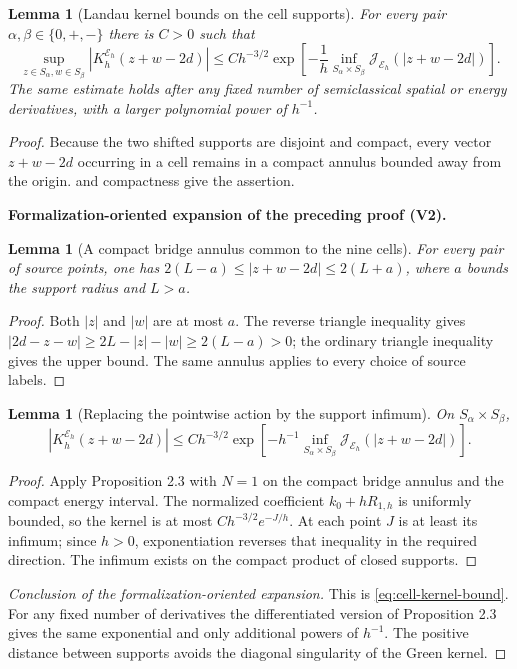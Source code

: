 \documentclass[11pt]{article}
\newtheorem{lemma}[theorem]{Lemma}
\newcommand{\formalisationparentid}{X}
\newenvironment{formalisationaddition}[1]{\par\medskip\begingroup\color{blue}\def\formalisationparentid{#1}\setcounter{formalizationsublemma}{0}\let\lemma\formalizationsublemma\let\endlemma\endformalizationsublemma
  \def\Eo{\mathcal E_h^\circ}\def\EE{\mathcal E_h}\def\phio{\phi_h^\circ}\def\phih{\phi_h}\def\Ho{H_h^{\rm atom}(v^\circ)}\def\Ha{H_h^{\rm atom}}\def\HL{H_h^{L}}\def\Dh{D_h}\def\Log{\operatorname{Log}}\def\ellh{\ell_h}\def\Gp{G_{p,h}}\def\Ast{A_{*,h}}\def\ahat{\widehat{\mathfrak a}_h}\def\ah{\mathfrak a_h}\def\rh{\widehat\rho_h}\def\deltah{\widehat\delta_h}\def\oldref##1{\textup{(##1)}}\def\interface##1{\par\noindent\textit{Analytical interface used here.} ##1\par}\def\finish{\par\noindent\textit{Conclusion of the formalization-oriented expansion.} }\par\noindent\textbf{Formalization-oriented expansion of the preceding proof (V2).}\par\smallskip
}{\par\endgroup\medskip
}
\newcommand{\cE}{\mathcal E}
\newcommand{\cJ}{\mathcal J}
\begin{document}
\begin{lemma}[Landau kernel bounds on the cell supports]
\label{lem:global-kernel-bound}
For every pair $\alpha,\beta\in\{0,+,-\}$ there is $C>0$ such that
\begin{equation}\label{eq:cell-kernel-bound}
 \sup_{z\in S_\alpha,w\in S_\beta}
 |K_h^{\cE_h}(z+w-2d)|
 \le Ch^{-3/2}
 \exp\!\left[-\frac1h
 \inf_{S_\alpha\times S_\beta}
 \cJ_{\cE_h}(|z+w-2d|)\right].
\end{equation}
The same estimate holds after any fixed number of semiclassical spatial or
energy derivatives, with a larger polynomial power of $h^{-1}$.
\end{lemma}

\begin{proof}
Because the two shifted supports are disjoint and compact, every vector
$z+w-2d$ occurring in a cell remains in a compact annulus bounded away from
the origin.  
and compactness give the assertion.

\begin{formalisationaddition}{L5.7}
\begin{lemma}[A compact bridge annulus common to the nine cells]\label{sublemma:L5-7-annulus}
For every pair of source points, one has
$2(L-a)\le|z+w-2d|\le2(L+a)$, where $a$ bounds the support radius and $L>a$.
\end{lemma}
\begin{proof}
Both $|z|$ and $|w|$ are at most $a$. The reverse triangle inequality gives
$|2d-z-w|\ge2L-|z|-|w|\ge2(L-a)>0$; the ordinary triangle inequality gives the upper bound. The same annulus applies to every choice of source labels.
\end{proof}

\begin{lemma}[Replacing the pointwise action by the support infimum]\label{sublemma:L5-7-kernel-infimum}
On $S_\alpha\times S_\beta$,
\[
 |K_h^{\mathcal E_h}(z+w-2d)|\le
 Ch^{-3/2}\exp\!\left[-h^{-1}\inf_{S_\alpha\times S_\beta}
 \cJ_{\mathcal E_h}(|z+w-2d|)\right].
\]
\end{lemma}
\begin{proof}
Apply Proposition 2.3 with $N=1$ on the compact bridge annulus and the compact energy interval. The normalized coefficient $k_0+hR_{1,h}$ is uniformly bounded, so the kernel is at most $Ch^{-3/2}e^{-J/h}$. At each point $J$ is at least its infimum; since $h>0$, exponentiation reverses that inequality in the required direction. The infimum exists on the compact product of closed supports.
\end{proof}
\finish This is \eqref{eq:cell-kernel-bound}. For any fixed number of derivatives the differentiated version of Proposition 2.3 gives the same exponential and only additional powers of $h^{-1}$. The positive distance between supports avoids the diagonal singularity of the Green kernel.
\end{formalisationaddition}

\end{proof}
\end{document}

